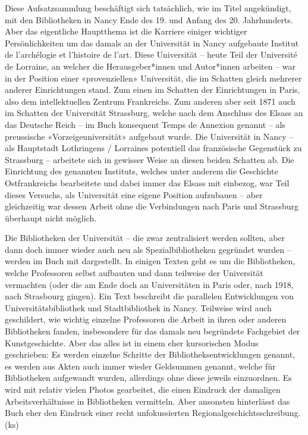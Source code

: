\documentclass[a4paper,
fontsize=11pt,
oneside,
numbers=noperiodatend,
parskip=half-,
bibliography=totoc,
final
]{scrartcl}
\begin{document}
Diese Aufsatzsammlung beschäftigt sich tatsächlich, wie im Titel
angekündigt, mit den Bibliotheken in Nancy Ende des 19. und Anfang des
20. Jahrhunderts. Aber das eigentliche Hauptthema ist die Karriere
einiger wichtiger Persönlichkeiten um das damals an der Universität in
Nancy aufgebaute Institut de l'archélogie et l'histoire de l'art. Diese
Universität -- heute Teil der Université de Lorraine, an welcher die
Herausgeber*innen und Autor*innen arbeiten -- war in der Position einer
«provenziellen» Universität, die im Schatten gleich mehrerer anderer
Einrichtungen stand. Zum einen im Schatten der Einrichtungen in Paris,
also dem intellektuellen Zentrum Frankreichs. Zum anderen aber seit 1871
auch im Schatten der Universität Strassburg, welche nach dem Anschluss
des Elsass an das Deutsche Reich -- im Buch konsequent Temps de Annexion
genannt -- als preussische «Vorzeigeuniversität» aufgebaut wurde. Die
Universität in Nancy -- als Hauptstadt Lothringens / Lorraines
potentiell das französische Gegenstück zu Strassburg -- arbeitete sich
in gewisser Weise an diesen beiden Schatten ab. Die Einrichtung des
genannten Instituts, welches unter anderem die Geschichte Ostfrankreichs
bearbeitete und dabei immer das Elsass mit einbezog, war Teil dieses
Versuchs, als Universität eine eigene Position aufzubauen -- aber
gleichzeitig war dessen Arbeit ohne die Verbindungen nach Paris und
Strassburg überhaupt nicht möglich.

Die Bibliotheken der Universität -- die zwar zentralisiert werden
sollten, aber dann doch immer wieder auch neu als Spezialbibliotheken
gegründet wurden -- werden im Buch mit dargestellt. In einigen Texten
geht es um die Bibliotheken, welche Professoren selbst aufbauten und
dann teilweise der Universität vermachten (oder die am Ende doch an
Universitäten in Paris oder, nach 1918, nach Strasbourg gingen). Ein
Text beschreibt die parallelen Entwicklungen von Universitätsbibliothek
und Stadtbibliothek in Nancy. Teilweise wird auch geschildert, wie
wichtig einzelne Professoren die Arbeit in ihren oder anderen
Bibliotheken fanden, insbesondere für das damals neu begründete
Fachgebiet der Kunstgeschichte. Aber das alles ist in einem eher
kursorischen Modus geschrieben: Es werden einzelne Schritte der
Bibliotheksentwicklungen genannt, es werden aus Akten auch immer wieder
Geldsummen genannt, welche für Bibliotheken aufgewandt wurden,
allerdings ohne diese jeweils einzuordnen. Es wird mit relativ vielen
Photos gearbeitet, die einen Eindruck der damaligen Arbeitsverhältnisse
in Bibliotheken vermitteln. Aber ansonsten hinterlässt das Buch eher den
Eindruck einer recht unfokussierten Regionalgeschichtsschreibung. (ks)
\end{document}
